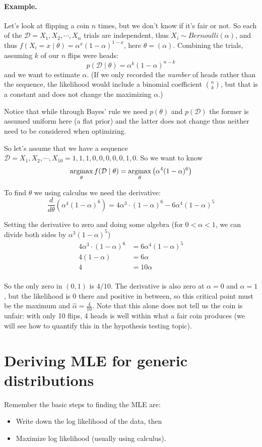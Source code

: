 \paragraph{Example. }
Let's look at flipping a coin $n$ times, but we don't know if it's fair or not. 
So each of the $\mathcal{D} = X_1, X_2, \cdots, X_n$ trials are independent, 
thus $X_i \sim Bernoulli(\alpha)$, and thus $f(X_i=x\mid\theta)=\alpha^x(1-\alpha)^{1-x}$, 
here $\theta = (\alpha)$. 
Combining the trials, assuming $k$ of our $n$ flips were heads: 
\[p(\mathcal{D}\mid\theta) = \alpha^k(1-\alpha)^{n-k}\]
and we want to estimate $\alpha$. 
(If we only recorded the \emph{number} of heads rather than the sequence, the likelihood would include a binomial coefficient ${n \choose k}$, but that is a constant and does not change the maximizing $\alpha$.)

Notice that while through Bayes' rule we need $p(\theta)$ and $p(\mathcal{D})$ 
the former is assumed uniform here (a flat prior) and the latter does not change thus neither need to be considered when optimizing. 

So let's assume that we have a sequence $\mathcal{D} = X_1, X_2, \cdots, X_{10} = 1,1,1,0,0,0,0,0,1,0$.
So we want to know 
\[\operatorname*{argmax}_\theta f(\mathcal{D}\mid\theta) = \operatorname*{argmax}_\theta \left(\alpha^4(1-\alpha)^6\right)\]

To find $\theta$ we using calculus we need the derivative: 
\[\frac{d}{d\theta}\left(\alpha^4(1-\alpha)^6\right) = 4\alpha^3\cdot(1-\alpha)^6-6\alpha^4(1-\alpha)^5\]

Setting the derivative to zero and doing some algebra (for $0<\alpha<1$, we can divide both sides by $\alpha^3(1-\alpha)^5$)
\begin{align*}
4\alpha^3\cdot(1-\alpha)^6&=6\alpha^4(1-\alpha)^5\\
4(1-\alpha) &= 6\alpha\\
4 &= 10\alpha\\
\end{align*}

So the only zero in $(0,1)$ is $4/10$. The derivative is also zero at $\alpha=0$ and $\alpha=1$, but the likelihood is $0$ there and positive in between, so this critical point must be the maximum and $\hat{\alpha} = \frac{4}{10}$.
Note that this alone does not tell us the coin is unfair: with only 10 flips, 4 heads is well within what a fair coin produces (we will see how to quantify this in the hypothesis testing topic). 

\section{Deriving MLE for generic distributions}
Remember the basic steps to finding the MLE are: 
\begin{itemize}
\item Write down the log likelihood of the data, then
\item Maximize log likelihood (usually using calculus). 
\end{itemize}

